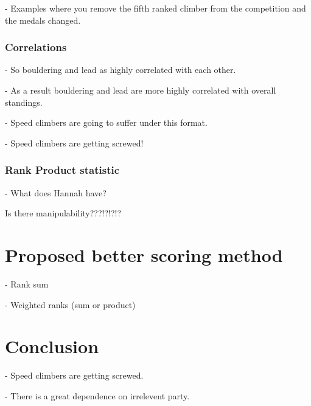 \documentclass{article}\usepackage[]{graphicx}\usepackage[]{color}
\begin{document}
- Examples where you remove the fifth ranked climber from the competition and the medals changed. 

\subsubsection{Correlations}

- So bouldering and lead as highly correlated with each other. 

- As a result bouldering and lead are more highly correlated with overall standings.  

- Speed climbers are going to suffer under this format.  

- Speed climbers are getting screwed!

\subsubsection{Rank Product statistic}

- What does Hannah have?

Is there manipulability???!?!?!?

% 

\section{Proposed better scoring method}

- Rank sum

- Weighted ranks (sum or product)

\section{Conclusion}

- Speed climbers are getting screwed.  

- There is a great dependence on irrelevent party. 




\end{document}
